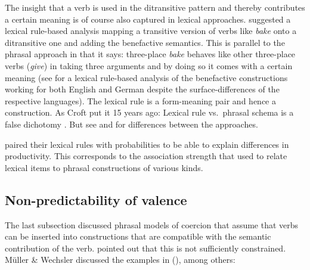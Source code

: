 \documentclass[output=paper]{langsci/langscibook}
\begin{document}
The insight that a verb is used in the ditransitive pattern and thereby contributes a certain
meaning is of course also captured in lexical approaches. \citet{BC99a} suggested a lexical
rule-based analysis mapping a transitive version of verbs like \emph{bake} onto a ditransitive one
and adding the benefactive semantics. This is parallel to the phrasal approach in that it says:
three-place \emph{bake} behaves like other three-place verbs (\eg \emph{give}) in taking three
arguments and by doing so it comes with a certain meaning (see \citealt{MuellerLFGphrasal} for a
lexical rule-based analysis of the benefactive constructions working for both English and German
despite the surface-differences of the respective languages). The lexical rule is a form-meaning pair
and hence a construction. As Croft put it 15 years ago: Lexical rule vs.\ phrasal schema is a false
dichotomy \citep{Croft2003a}. But see  and  for
differences between the approaches.

\citet{BC99a} paired their lexical rules with probabilities to be able to explain differences in
productivity. This corresponds to the association strength that \citet[]{vanTrijp2011a} used to relate
lexical items to phrasal constructions of various kinds.

\subsection{Non-predictability of valence}

The last subsection discussed phrasal models of coercion that assume that verbs can be inserted
into constructions that are compatible with the semantic contribution of the verb. \citet[Section~7.4]{MWArgSt}
pointed out that this is not sufficiently constrained. Müller \& Wechsler discussed the examples in
(), among others:
\end{document}
